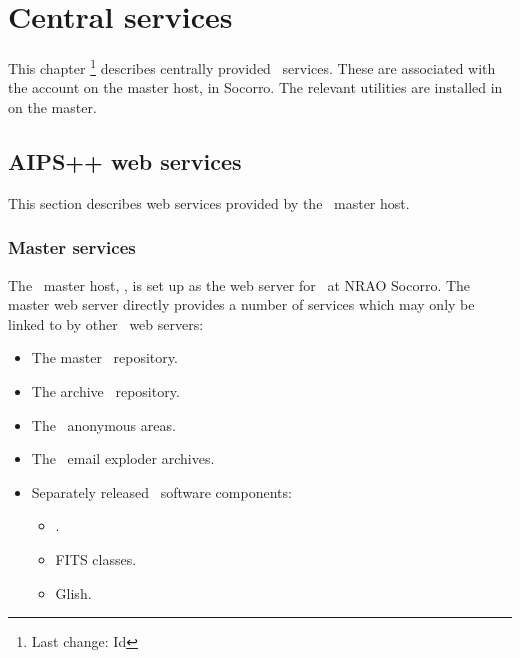 \chapter{Central services}
\label{Central services}


This chapter \footnote{Last change:
$ $Id$ $}
describes centrally provided \aipspp\ services.  These are associated with
the  account on the master host,  in
Socorro.  The relevant utilities are installed in  on the
master.

 
\section{AIPS++ web services}
\label{web services}


This section describes web services provided by the \aipspp\ master host.

\subsection*{Master services}

The \aipspp\ master host, , is set up as the web server
for \aipspp\ at NRAO Socorro.  The master web server directly provides a
number of services which may only be linked to by other \aipspp\ web servers:

\begin{itemize}
\item
   The master \rcs\ repository.

\item
   The archive \rcs\ repository.

\item
   The \aipspp\ anonymous  areas.

\item
   The \aipspp\ email exploder archives.

\item
   Separately released \aipspp\ software components:
   \begin{itemize}
   \item
       .
   \item
       FITS classes.
   \item
       Glish.
   \end{itemize}
\end{itemize}

